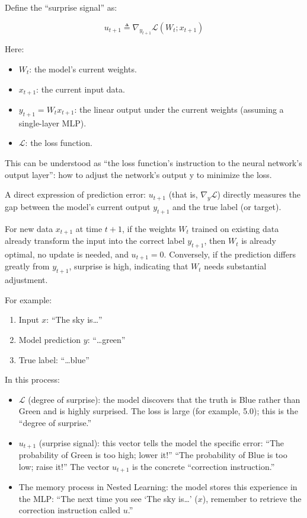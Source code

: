 Define the ``surprise signal'' as:

\[
u_{t+1}\triangleq \nabla_{y_{t+1}}\mathcal{L}(W_t;x_{t+1})
\]

Here:

\begin{itemize}
\tightlist
\item
  \(W_t\): the model's current weights.
\item
  \(x_{t+1}\): the current input data.
\item
  \(y_{t+1}=W_tx_{t+1}\): the linear output under the current weights (assuming a single-layer MLP).
\item
  \(\mathcal{L}\): the loss function.
\end{itemize}

This can be understood as ``the loss function's instruction to the neural network's output layer'': how to adjust the network's output y to minimize the loss.

A direct expression of prediction error: \(u_{t+1}\) (that is, \(\nabla_y\mathcal{L}\)) directly measures the gap between the model's current output \(y_{t+1}\) and the true label (or target).

For new data \(x_{t+1}\) at time \(t+1\), if the weights \(W_t\) trained on existing data already transform the input into the correct label \(y_{t+1}\), then \(W_t\) is already optimal, no update is needed, and \(u_{t+1}=0\). Conversely, if the prediction differs greatly from \(y_{t+1}\), surprise is high, indicating that \(W_t\) needs substantial adjustment.

For example:

\begin{enumerate}
\def\labelenumi{\arabic{enumi}.}
\tightlist
\item
  Input \(x\): ``The sky is\ldots{}''
\item
  Model prediction \(y\): ``\ldots green''
\item
  True label: ``\ldots blue''
\end{enumerate}

In this process:

\begin{itemize}
\tightlist
\item
  \(\mathcal{L}\) (degree of surprise): the model discovers that the truth is Blue rather than Green and is highly surprised. The loss is large (for example, 5.0); this is the ``degree of surprise.''
\item
  \(u_{t+1}\) (surprise signal): this vector tells the model the specific error: ``The probability of Green is too high; lower it!'' ``The probability of Blue is too low; raise it!'' The vector \(u_{t+1}\) is the concrete ``correction instruction.''
\item
  The memory process in Nested Learning: the model stores this experience in the MLP: ``The next time you see `The sky is\ldots{}' (\(x\)), remember to retrieve the correction instruction called \(u\).''
\end{itemize}

